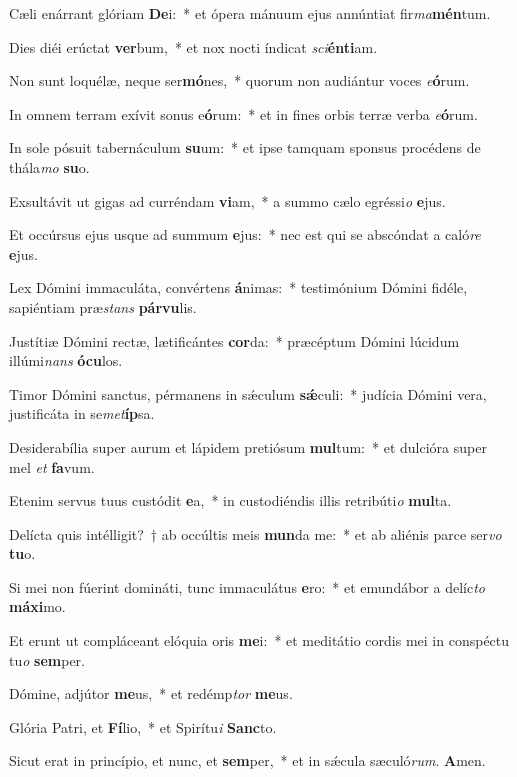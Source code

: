 \item Cæli enárrant glóriam \textbf{De}i:~* et ópera mánuum ejus annúntiat fir\textit{ma}\textbf{mén}tum.
\item Dies diéi erúctat \textbf{ver}bum,~* et nox nocti índicat \textit{sci}\textbf{én}\textbf{ti}am.
\item Non sunt loquélæ, neque ser\textbf{mó}nes,~* quorum non audiántur voces \textit{e}\textbf{ó}rum.
\item In omnem terram exívit sonus e\textbf{ó}rum:~* et in fines orbis terræ verba \textit{e}\textbf{ó}rum.
\item In sole pósuit tabernáculum \textbf{su}um:~* et ipse tamquam sponsus procédens de thála\textit{mo} \textbf{su}o.
\item Exsultávit ut gigas ad curréndam \textbf{vi}am,~* a summo cælo egréssi\textit{o} \textbf{e}jus.
\item Et occúrsus ejus usque ad summum \textbf{e}jus:~* nec est qui se abscóndat a caló\textit{re} \textbf{e}jus.
\item Lex Dómini immaculáta, convértens \textbf{á}nimas:~* testimónium Dómini fidéle, sapiéntiam præ\textit{stans} \textbf{pár}\textbf{vu}lis.
\item Justítiæ Dómini rectæ, lætificántes \textbf{cor}da:~* præcéptum Dómini lúcidum illúmi\textit{nans} \textbf{ó}\textbf{cu}los.
\item Timor Dómini sanctus, pérmanens in sǽculum \textbf{sǽ}culi:~* judícia Dómini vera, justificáta in se\textit{met}\textbf{íp}sa.
\item Desiderabília super aurum et lápidem pretiósum \textbf{mul}tum:~* et dulcióra super mel \textit{et} \textbf{fa}vum.
\item Etenim servus tuus custódit \textbf{e}a,~* in custodiéndis illis retribúti\textit{o} \textbf{mul}ta.
\item Delícta quis intélligit?~† ab occúltis meis \textbf{mun}da me:~* et ab aliénis parce ser\textit{vo} \textbf{tu}o.
\item Si mei non fúerint domináti, tunc immaculátus \textbf{e}ro:~* et emundábor a delíc\textit{to} \textbf{má}\textbf{xi}mo.
\item Et erunt ut compláceant elóquia oris \textbf{me}i:~* et meditátio cordis mei in conspéctu tu\textit{o} \textbf{sem}per.
\item Dómine, adjútor \textbf{me}us,~* et redémp\textit{tor} \textbf{me}us.
\item Glória Patri, et \textbf{Fí}lio,~* et Spirítu\textit{i} \textbf{Sanc}to.
\item Sicut erat in princípio, et nunc, et \textbf{sem}per,~* et in sǽcula sæculó\textit{rum}. \textbf{A}men.
